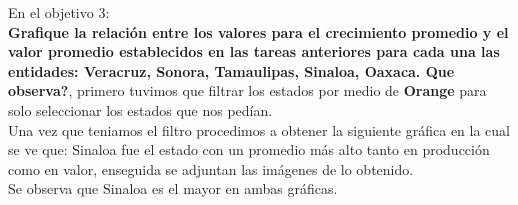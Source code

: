 \item En el objetivo 3: \\ {\bfseries Grafique la relación entre los valores para el crecimiento promedio y el valor promedio establecidos en las tareas anteriores para cada una las entidades: Veracruz, Sonora, Tamaulipas, Sinaloa, Oaxaca. Que observa?}, primero tuvimos que filtrar los estados por medio de {\bfseries Orange} para solo seleccionar los estados que nos pedían. \\
Una vez que teniamos el filtro procedimos a obtener la siguiente gráfica en la cual se ve que: Sinaloa fue el estado con un promedio más alto tanto en producción como en valor, enseguida se adjuntan las imágenes de lo obtenido.\\
Se observa que Sinaloa es el mayor en ambas gráficas.